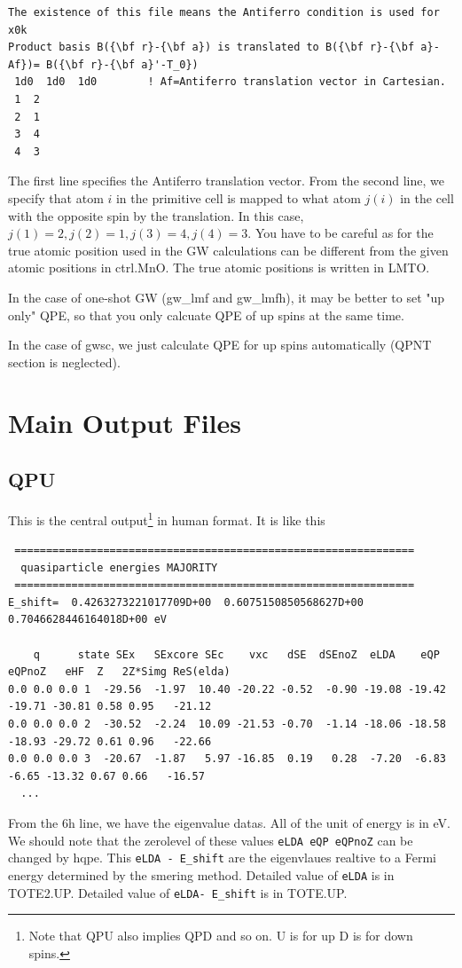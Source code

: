 \documentclass[a4paper,10pt,epsf,fleqn]{article}
\newcommand{\fx}[1]{\subsection{\sf #1\index{\sf #1}}}
\begin{document}
{{\baselineskip=2.6mm \small
\begin{verbatim} 
The existence of this file means the Antiferro condition is used for x0k
Product basis B({\bf r}-{\bf a}) is translated to B({\bf r}-{\bf a}-Af})= B({\bf r}-{\bf a}'-T_0})
 1d0  1d0  1d0        ! Af=Antiferro translation vector in Cartesian.
 1  2
 2  1
 3  4
 4  3
\end{verbatim}}
The first line specifies the Antiferro translation vector.
From the second line, we specify that atom $i$ in the primitive cell
is mapped to what atom $j(i)$ in the cell with the opposite spin by
the translation. In this case, $j(1)=2, j(2)=1,j(3)=4, j(4)=3$.
You have to be careful as for the true atomic position used in 
the GW calculations can be different from the given atomic positions in
{\sf ctrl.MnO}. The true atomic positions is written in {\sf LMTO}.


In the case of one-shot GW (gw\_lmf and gw\_lmfh),
it may be better to set "up only" QPE,
so that you only calcuate QPE of up spins at the same time.

In the case of gwsc, we just calculate QPE for up spins
automatically (QPNT section is neglected).



\newpage
\section{Main Output Files}

\label{mainoutput}
\fx{QPU}
This is the central output\footnote{Note that QPU also implies QPD and so on. U is for up D is for down spins.} in
human format. It is like this
{\baselineskip=2.6mm \small
\begin{verbatim} 
 ===============================================================
  quasiparticle energies MAJORITY
 ===============================================================
E_shift=  0.4263273221017709D+00  0.6075150850568627D+00  0.7046628446164018D+00 eV

    q      state SEx   SExcore SEc    vxc   dSE  dSEnoZ  eLDA    eQP  eQPnoZ   eHF  Z   2Z*Simg ReS(elda)
0.0 0.0 0.0 1  -29.56  -1.97  10.40 -20.22 -0.52  -0.90 -19.08 -19.42 -19.71 -30.81 0.58 0.95   -21.12
0.0 0.0 0.0 2  -30.52  -2.24  10.09 -21.53 -0.70  -1.14 -18.06 -18.58 -18.93 -29.72 0.61 0.96   -22.66
0.0 0.0 0.0 3  -20.67  -1.87   5.97 -16.85  0.19   0.28  -7.20  -6.83  -6.65 -13.32 0.67 0.66   -16.57
  ...
\end{verbatim}}
From the 6h line, we have the eigenvalue datas. All of the unit of energy is in eV.
We should note that the zerolevel of these values {\tt eLDA  eQP eQPnoZ} can be changed  by hqpe.
This {\tt eLDA - E\_shift} are the eigenvlaues realtive to a Fermi energy determined by the smering method.
Detailed value of {\tt eLDA} is in {\sf TOTE2.UP}.
Detailed value of {\tt eLDA- E\_shift} is in {\sf TOTE.UP}.

}
\end{document}
